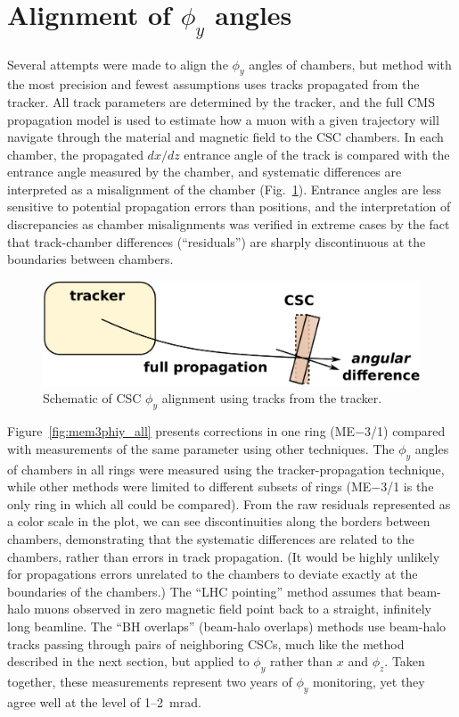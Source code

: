 \documentclass[12pt]{article}
\begin{document}
\section{Alignment of $\phi_y$ angles}

Several attempts were made to align the $\phi_y$ angles of chambers,
but method with the most precision and fewest assumptions uses tracks
propagated from the tracker.  All track parameters are determined by
the tracker, and the full CMS propagation model is used to estimate
how a muon with a given trajectory will navigate through the material
and magnetic field to the CSC chambers.  In each chamber, the
propagated $dx/dz$ entrance angle of the track is compared with the
entrance angle measured by the chamber, and systematic differences are
interpreted as a misalignment of the chamber
(Fig.~\ref{fig:phiy_alignment}).  Entrance angles are less sensitive
to potential propagation errors than positions, and the interpretation
of discrepancies as chamber misalignments was verified in extreme
cases by the fact that track-chamber differences (``residuals'')
are sharply discontinuous at the boundaries between chambers.

\begin{figure}
\begin{center}
\includegraphics[width=0.5\linewidth]{phiy_alignment.pdf}
\end{center}

\caption{Schematic of CSC $\phi_y$ alignment using tracks from the tracker. \label{fig:phiy_alignment}}
\end{figure}

Figure~\ref{fig:mem3phiy_all} presents corrections in one ring
(ME$-$3/1) compared with measurements of the same parameter using
other techniques.  The $\phi_y$ angles of chambers in all rings were
measured using the tracker-propagation technique, while other methods
were limited to different subsets of rings (ME$-$3/1 is the only ring
in which all could be compared).  From the raw residuals represented
as a color scale in the plot, we can see discontinuities along the
borders between chambers, demonstrating that the systematic
differences are related to the chambers, rather than errors in track
propagation.  (It would be highly unlikely for propagations errors
unrelated to the chambers to deviate exactly at the boundaries of the
chambers.)  The ``LHC pointing'' method assumes that beam-halo muons
observed in zero magnetic field point back to a straight, infinitely
long beamline.  The ``BH overlaps'' (beam-halo overlaps) methods use
beam-halo tracks passing through pairs of neighboring CSCs, much like
the method described in the next section, but applied to $\phi_y$
rather than $x$ and $\phi_z$.  Taken together, these measurements
represent two years of $\phi_y$ monitoring, yet they agree well at
the level of 1--2~mrad.
\end{document}
